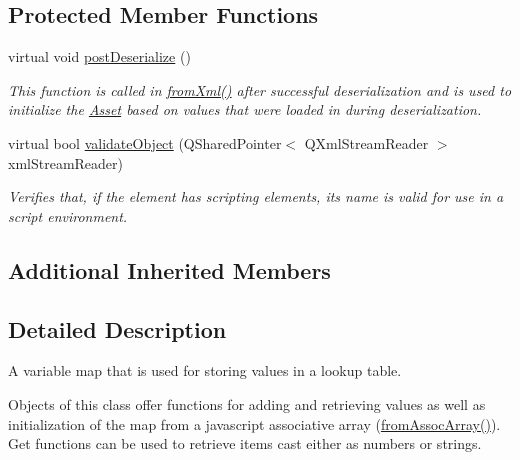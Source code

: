 \subsection*{Protected Member Functions}
\begin{DoxyCompactItemize}
\item 
virtual void \hyperlink{class_picto_1_1_variable_map_a8f40e1a04708e7632fa51b25e4eb4850}{post\-Deserialize} ()
\begin{DoxyCompactList}\small\item\em This function is called in \hyperlink{class_picto_1_1_asset_a8bed4da09ecb1c07ce0dab313a9aba67}{from\-Xml()} after successful deserialization and is used to initialize the \hyperlink{class_picto_1_1_asset}{Asset} based on values that were loaded in during deserialization. \end{DoxyCompactList}\item 
\hypertarget{class_picto_1_1_variable_map_ac8284493461722d9d51f459de6e387e3}{virtual bool \hyperlink{class_picto_1_1_variable_map_ac8284493461722d9d51f459de6e387e3}{validate\-Object} (Q\-Shared\-Pointer$<$ Q\-Xml\-Stream\-Reader $>$ xml\-Stream\-Reader)}\label{class_picto_1_1_variable_map_ac8284493461722d9d51f459de6e387e3}

\begin{DoxyCompactList}\small\item\em Verifies that, if the element has scripting elements, its name is valid for use in a script environment. \end{DoxyCompactList}\end{DoxyCompactItemize}
\subsection*{Additional Inherited Members}


\subsection{Detailed Description}
A variable map that is used for storing values in a lookup table. 

Objects of this class offer functions for adding and retrieving values as well as initialization of the map from a javascript associative array (\hyperlink{class_picto_1_1_variable_map_afba834998d686c7b287b171f5992f642}{from\-Assoc\-Array()}). Get functions can be used to retrieve items cast either as numbers or strings.

